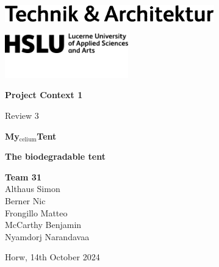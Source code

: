 \documentclass{article}
\begin{document}
\hypersetup{citecolor=black}

\begin{titlepage}
    \begin{flushleft}
        \hspace*{.01cm}
        \includegraphics[width=.3\textwidth]{media/hslu-logo-2.png}

        \vspace*{.01cm}
        \hspace*{.16cm}\includegraphics[width=0.4\textwidth]{media/hslu-svg-logo.png}
    \end{flushleft}

    \vspace*{-.4cm}
    {\huge \textbf{Project Context 1}}

    {\Large Review 3}

    \vspace*{3cm}
    \begin{center}
        {\Huge \textbf{My$_{\text{celium}}$Tent}}

        \vspace*{.1cm}
        \textbf{\large The biodegradable tent}

    \end{center}

    \vfill
    {\Large \textbf{Team 31}}\\
    {\large \vspace*{.01cm}
        Althaus Simon\\
        \vspace*{.01cm}
        Berner Nic\\
        \vspace*{.01cm}   
        Frongillo Matteo\\
        \vspace*{.01cm}
        McCarthy Benjamin\\
        \vspace*{.01cm}
        Nyamdorj Narandavaa\\
        \vspace*{.01cm}
    }
    
    \vspace{1cm}
    {\large Horw, 14th October 2024}
\end{titlepage}
\end{document}
